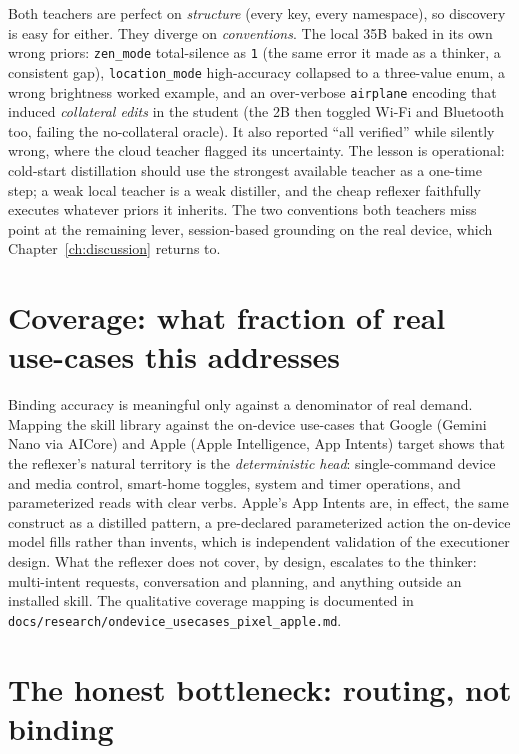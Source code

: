 Both teachers are perfect on \emph{structure} (every key, every namespace), so
discovery is easy for either. They diverge on \emph{conventions}. The local 35B
baked in its own wrong priors: \texttt{zen\_mode} total-silence as \texttt{1}
(the same error it made as a thinker, a consistent gap), \texttt{location\_mode}
high-accuracy collapsed to a three-value enum, a wrong brightness worked example,
and an over-verbose \texttt{airplane} encoding that induced \emph{collateral
edits} in the student (the 2B then toggled Wi-Fi and Bluetooth too, failing the
no-collateral oracle). It also reported ``all verified'' while silently wrong,
where the cloud teacher flagged its uncertainty. The lesson is operational:
cold-start distillation should use the strongest available teacher as a one-time
step; a weak local teacher is a weak distiller, and the cheap reflexer faithfully
executes whatever priors it inherits. The two conventions both teachers miss
point at the remaining lever, session-based grounding on the real device, which
Chapter~\ref{ch:discussion} returns to.

\section{Coverage: what fraction of real use-cases this addresses}
\label{sec:coverage}

Binding accuracy is meaningful only against a denominator of real demand. Mapping
the skill library against the on-device use-cases that Google (Gemini Nano via
AICore) and Apple (Apple Intelligence, App Intents) target shows that the
reflexer's natural territory is the \emph{deterministic head}: single-command
device and media control, smart-home toggles, system and timer operations, and
parameterized reads with clear verbs. Apple's App Intents are, in effect, the
same construct as a distilled pattern, a pre-declared parameterized action the
on-device model fills rather than invents, which is independent validation of
the executioner design. What the reflexer does not cover, by design, escalates to
the thinker: multi-intent requests, conversation and planning, and anything
outside an installed skill. The qualitative coverage mapping is documented in
\texttt{docs/research/ondevice\_usecases\_pixel\_apple.md}.

\section{The honest bottleneck: routing, not binding}
\label{sec:routing}

